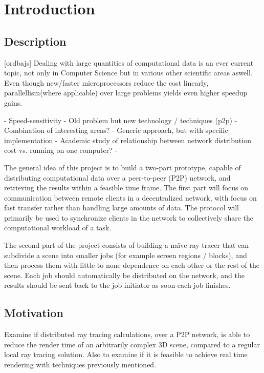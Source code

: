 \chapter{Introduction}
 
\section{Description}

[ordbajs]
Dealing with large quantities of computational data is an ever current topic, not only in Computer Science but in various other scientific areas aswell. Even though new/faster microprocessors reduce the cost linearly, parallellism(where applicable) over large problems yields even higher speedup gains. 


- Speed-sensitivity
- Old problem but new technology / techniques (p2p)
- Combination of interesting areas?
- Generic approach, but with specific implementation
- Academic study of relationship between network distribution cost vs. running on one computer?
-  

The general idea of this project is to build a two-part prototype, capable of distributing computational data over a peer-to-peer (P2P) network, and retrieving the results within a feasible time frame. The first part will focus on communication between remote clients in a decentralized network, with focus on fast transfer rather than handling large amounts of data. The protocol will primarily be used to synchronize clients in the network to collectively share the computational workload of a task. 

The second part of the project consists of building a naïve ray tracer that can subdivide a scene into smaller jobs (for example screen regions / blocks), and then process them with little to none dependence on each other or the rest of the scene. Each job should automatically be distributed on the network, and the results should be sent back to the job initiator as soon each job finishes.

\section{Motivation}
Examine if distributed ray tracing calculations, over a P2P network, is able to reduce the render time of an arbitrarily complex 3D scene, compared to a regular local ray tracing solution. Also to examine if it is feasible to achieve real time rendering with techniques previously mentioned.
 